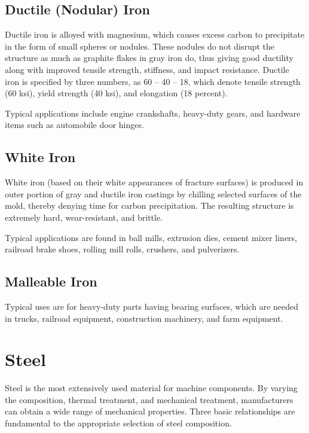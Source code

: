 \documentclass[a4paper,openany,12pt]{book}
\begin{document}
\subsection{Ductile (Nodular) Iron}
\label{ductile-nodular-iron}
Ductile iron is alloyed with magnesium, which causes excess carbon to
precipitate in the form of small spheres or nodules. These nodules do
not disrupt the structure as much as graphite flakes in gray iron do,
thus giving good ductility along with improved tensile strength,
stiffness, and impact resistance. Ductile iron is specified by three
numbers, as 60 -- 40 -- 18, which denote tensile strength (60 ksi),
yield strength (40 ksi), and elongation (18 percent).

Typical applications include engine crankshafts, heavy-duty gears, and
hardware items such as automobile door hinges.

\subsection{White Iron}
\label{white-iron}
White iron (based on their white appearances of fracture surfaces) is
produced in outer portion of gray and ductile iron castings by chilling
selected surfaces of the mold, thereby denying time for carbon
precipitation. The resulting structure is extremely hard,
wear-resistant, and brittle.

Typical applications are found in ball mills, extrusion dies, cement
mixer liners, railroad brake shoes, rolling mill rolls, crushers, and
pulverizers.

\subsection{Malleable Iron}
\label{malleable-iron}
Typical uses are for heavy-duty parts having bearing surfaces, which are
needed in trucks, railroad equipment, construction machinery, and farm
equipment.

\section{Steel}
\label{steel}
Steel is the most extensively used material for machine components. By
varying the composition, thermal treatment, and mechanical treatment,
manufacturers can obtain a wide range of mechanical properties. Three
basic relationships are fundamental to the appropriate selection of
steel composition.
\end{document}
